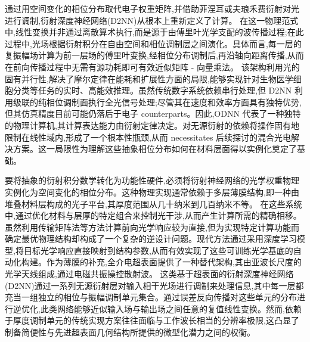\documentclass[11pt]{article}
\begin{document}
通过用空间变化的相位分布取代电子权重矩阵,并借助菲涅耳或夫琅禾费衍射对光进行调制,衍射深度神经网络(D2NN)从根本上重新定义了计算。\citep{doi_10_1126_science_aat8084_e055772d} \citep{doi_10_1117_12_2675468_10b5d458} 在这一物理范式中,线性变换并非通过离散算术执行,而是源于由傅里叶光学支配的波传播过程;在此过程中,光场根据衍射积分在自由空间和相位调制层之间演化。具体而言,每一层的复振幅场计算为前一层场的傅里叶变换,经相位分布调制后,再沿轴向距离传播,从而在前向传播过程中无需有源功耗即可有效近似矩阵 - 向量乘法。\citep{doi_10_1117_1_apn_5_1_016005_dfabad74} 该架构利用光的固有并行性,解决了摩尔定律在能耗和扩展性方面的局限,能够实现针对生物医学细胞分类等任务的实时、高能效推理。虽然传统数字系统依赖串行处理,但 D2NN 利用级联的纯相位调制面执行全光信号处理;尽管其在速度和效率方面具有独特优势,但其仿真精度目前可能仍落后于电子 counterparts。因此,ODNN 代表了一种独特的物理计算机,其计算表达能力由衍射定律决定。对无源衍射的依赖将操作固有地限制在线性域内,形成了一个根本性瓶颈,从而 necessitates 后续探讨的混合光电解决方案。这一局限性为理解这些抽象相位分布如何在材料层面得以实例化奠定了基础。\citep{doi_10_1364_ol_593231_ab93febc} \citep{s2_f7b7631268f17b1f868015df0bd08ef57904024d_011f3a59} \citep{doi_10_1063_5_0323145_de1041b1} \citep{doi_10_1109_twc_2025_3632886_01858e99} \citep{doi_10_3390_life13051148_9434b5b6} \citep{doi_10_1364_ol_428761_f1f67ac8} \citep{doi_10_1002_lpor_202200348_d54cae18}

要将抽象的衍射积分数学转化为功能性硬件,必须将衍射神经网络的光学权重物理实例化为空间变化的相位分布。这种物理实现通常依赖于多层薄膜结构,即一种由堆叠材料层构成的光子平台,其厚度范围从几十纳米到几百纳米不等。\citep{doi_10_1039_d5nh00367a_1be9a889} \citep{doi_10_1002_smtd_202400087_8e52a90c} 在这些系统中,通过优化材料与层厚的特定组合来控制光干涉,从而产生计算所需的精确相移。虽然利用传输矩阵法等方法计算前向光学响应较为直接,但为实现特定计算功能而确定最优物理结构却构成了一个复杂的逆设计问题。现代方法通过采用深度学习模型,将目标光学响应直接映射到结构参数,从而有效实现了这些可训练光学基底的自动化构建。作为薄膜的补充,全介电超表面提供了一种替代架构,其由亚波长尺度的光学天线组成,通过电磁共振操控散射波。\citep{doi_10_1088_1612_202x_ab2121_c375efca} \citep{doi_10_1109_mac64480_2025_11140514_7f08c073} 这类基于超表面的衍射深度神经网络(D2NN)通过一系列无源衍射层对输入相干光场进行调制来处理信息,其中每一层都充当一组独立的相位与振幅调制单元集合。通过误差反向传播对这些单元的分布进行逆优化,此类网络能够近似输入场与输出场之间任意的复值线性变换。然而,依赖于厚度调制单元的传统实现方案往往面临与工作波长相当的分辨率极限,这凸显了制备简便性与先进超表面几何结构所提供的微型化潜力之间的权衡。\citep{doi_10_1016_j_isci_2025_112222_1f7c10f5} \citep{doi_10_1515_nanoph_2023_0760_2c3ec088}
\end{document}
